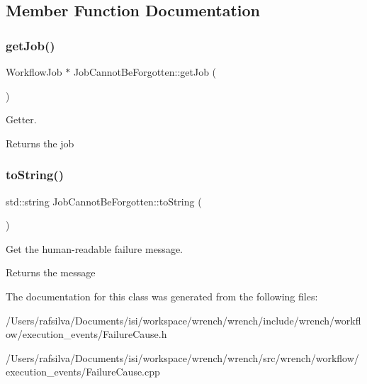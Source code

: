 \subsection{Member Function Documentation}
\mbox{\label{class_job_cannot_be_forgotten_a998be9b69eb911d071773ab8cb9d5ac0}} 
\subsubsection{\texorpdfstring{get\+Job()}{getJob()}}
{\footnotesize\ttfamily Workflow\+Job $\ast$ Job\+Cannot\+Be\+Forgotten\+::get\+Job (\begin{DoxyParamCaption}{ }\end{DoxyParamCaption})}



Getter. 

\begin{DoxyReturn}{Returns}
the job 
\end{DoxyReturn}
\mbox{\label{class_job_cannot_be_forgotten_afec3f02dea4282b31f914cf2b9ab2b54}} 
\subsubsection{\texorpdfstring{to\+String()}{toString()}}
{\footnotesize\ttfamily std\+::string Job\+Cannot\+Be\+Forgotten\+::to\+String (\begin{DoxyParamCaption}{ }\end{DoxyParamCaption})}



Get the human-\/readable failure message. 

\begin{DoxyReturn}{Returns}
the message 
\end{DoxyReturn}


The documentation for this class was generated from the following files\+:\begin{DoxyCompactItemize}
\item 
/\+Users/rafsilva/\+Documents/isi/workspace/wrench/wrench/include/wrench/workflow/execution\+\_\+events/Failure\+Cause.\+h\item 
/\+Users/rafsilva/\+Documents/isi/workspace/wrench/wrench/src/wrench/workflow/execution\+\_\+events/Failure\+Cause.\+cpp\end{DoxyCompactItemize}
